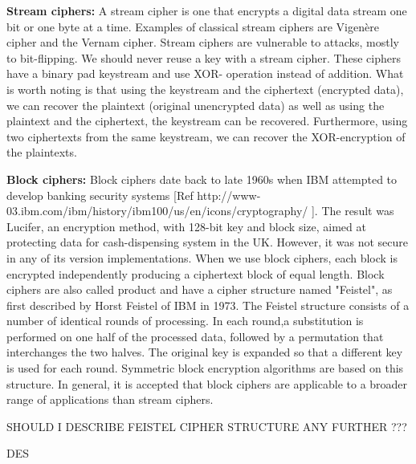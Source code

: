 \textbf{Stream ciphers:} A stream cipher is one that encrypts a digital data stream one bit or one byte at a time. Examples of classical stream ciphers are Vigenère cipher and the Vernam cipher. Stream ciphers are vulnerable to attacks, mostly to bit-flipping. We should never reuse a key with a stream cipher. These ciphers have a binary pad keystream and use XOR- operation instead of addition. What is worth noting is that using the keystream and the ciphertext (encrypted data), we can recover the plaintext (original unencrypted data) as well as using the plaintext and the ciphertext, the keystream can be recovered. Furthermore, using two ciphertexts from the same keystream, we can recover the XOR-encryption of the plaintexts.

\textbf{Block ciphers:} Block ciphers date back to late 1960s when IBM attempted to develop banking security systems [Ref http://www-03.ibm.com/ibm/history/ibm100/us/en/icons/cryptography/ ]. The result was Lucifer, an encryption method, with 128-bit key and block size, aimed at protecting data for cash-dispensing system in the UK. However, it was not secure in any of its version implementations. 
When we use block ciphers, each block is encrypted independently producing a ciphertext block of equal length. Block ciphers are also called product and have a cipher structure named "Feistel", as first described by Horst Feistel of IBM in 1973. The Feistel structure consists of a number of identical rounds of processing. In each round,a substitution is performed on one half of the processed data, followed by a permutation that interchanges the two halves. The original key is expanded so that a different key is used for each round. Symmetric block encryption algorithms are based on this structure. 
In general, it is accepted that block ciphers are applicable to a broader range of applications than stream ciphers. 


SHOULD I DESCRIBE FEISTEL CIPHER STRUCTURE ANY FURTHER ???

DES

